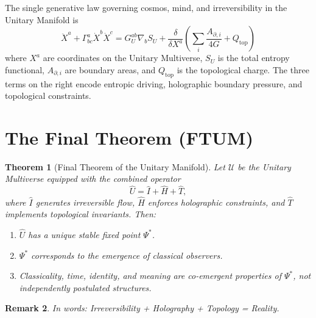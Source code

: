 \documentclass[12pt,a4paper]{article}
\newtheorem{theorem}{Theorem}[section]
\newtheorem{remark}[theorem]{Remark}
\begin{document}
The single generative law governing cosmos, mind, and irreversibility in the
Unitary Manifold is
\begin{equation}
  \boxed{
  \ddot{X}^a
  + \Gamma^a_{bc}\dot{X}^b\dot{X}^c
  = G_U^{ab}\nabla_b S_U
    + \frac{\delta}{\delta X^a}\!\left(
        \sum_i \frac{A_{\partial,i}}{4G}
        + Q_{\text{top}}
      \right)
  }
  \label{eq:UEUM}
\end{equation}
where $X^a$ are coordinates on the Unitary Multiverse, $S_U$ is the total
entropy functional, $A_{\partial,i}$ are boundary areas, and $Q_{\text{top}}$
is the topological charge.  The three terms on the right encode entropic
driving, holographic boundary pressure, and topological constraints.

\section{The Final Theorem (FTUM)}
\label{sec:FTUM}

\begin{theorem}[Final Theorem of the Unitary Manifold]
  Let $\mathcal{U}$ be the Unitary Multiverse equipped with the combined
  operator
  \begin{equation}
    \hat{U} = \hat{I} + \hat{H} + \hat{T} ,
    \label{eq:U-operator}
  \end{equation}
  where $\hat{I}$ generates irreversible flow, $\hat{H}$ enforces holographic
  constraints, and $\hat{T}$ implements topological invariants.  Then:
  \begin{enumerate}
    \item $\hat{U}$ has a unique stable fixed point $\Psi^*$.
    \item $\Psi^*$ corresponds to the emergence of classical observers.
    \item Classicality, time, identity, and meaning are co-emergent properties
          of $\Psi^*$, not independently postulated structures.
  \end{enumerate}
\end{theorem}

\begin{remark}
  In words: \textit{Irreversibility + Holography + Topology = Reality.}
\end{remark}
\end{document}
